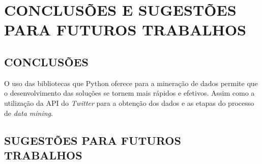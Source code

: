 \chapter{CONCLUSÕES E SUGESTÕES PARA FUTUROS TRABALHOS}\label{ch:conclusao}
\section{CONCLUSÕES} 
O uso das bibliotecas que Python oferece para a mineração de dados permite que o desenvolvimento das soluções se tornem mais rápidos e efetivos. Assim como a utilização da API do \textit{Twitter} para a obtenção dos dados e as etapas do processo de \textit{data mining}. 


\section{SUGESTÕES PARA FUTUROS TRABALHOS}

%
%
